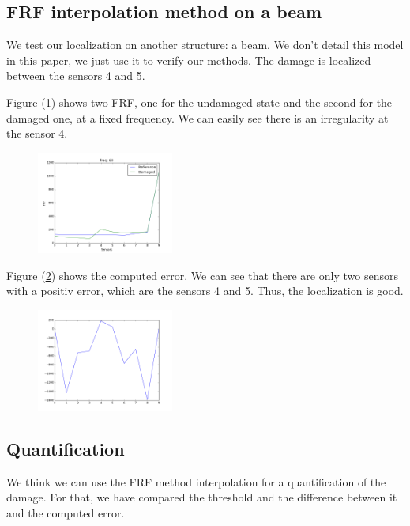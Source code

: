 \documentclass[journal]{IEEEtran}
\begin{document}
\subsection{FRF interpolation method on a beam}

We test our localization on another structure: a beam. We don't detail this model in this paper, we just use it to verify our methods. The damage is localized between the sensors 4 and 5.

Figure (\ref{beam_curve}) shows two FRF, one for the undamaged state and the second for the damaged one, at a fixed frequency. We can easily see there is an irregularity at the sensor 4.

\begin{figure}[h!]
  \centering
  \includegraphics[width=0.4\textwidth]{images/poutre_curve2.png}
  \caption{}
  \label{beam_curve}
\end{figure}


Figure (\ref{beam_error}) shows the computed error. We can see that there are only two sensors with a positiv error, which are the sensors 4 and 5. Thus, the localization is good.

\begin{figure}[h!]
  \centering
  \includegraphics[width=0.4\textwidth]{images/poutre_error.png}
  \caption{}
  \label{beam_error}
\end{figure}



\subsection{Quantification}

We think we can use the FRF method interpolation for a quantification of the damage. For that, we have compared the threshold and the difference between it and the computed error.
\end{document}
